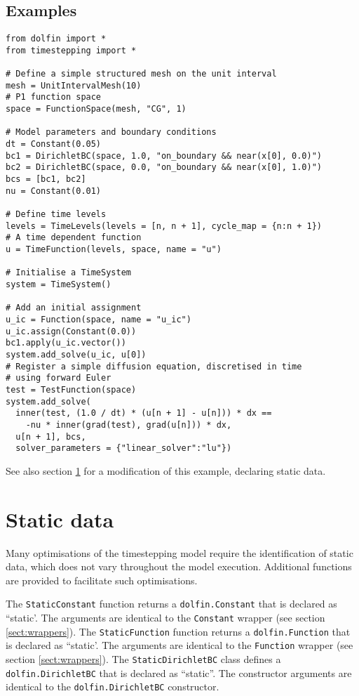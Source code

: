 \documentclass[a4paper]{book}
\begin{document}
\subsection*{Examples}

\begin{lstlisting}
from dolfin import *
from timestepping import *

# Define a simple structured mesh on the unit interval
mesh = UnitIntervalMesh(10)
# P1 function space
space = FunctionSpace(mesh, "CG", 1)

# Model parameters and boundary conditions
dt = Constant(0.05)
bc1 = DirichletBC(space, 1.0, "on_boundary && near(x[0], 0.0)")
bc2 = DirichletBC(space, 0.0, "on_boundary && near(x[0], 1.0)")
bcs = [bc1, bc2]
nu = Constant(0.01)

# Define time levels
levels = TimeLevels(levels = [n, n + 1], cycle_map = {n:n + 1})
# A time dependent function
u = TimeFunction(levels, space, name = "u")

# Initialise a TimeSystem
system = TimeSystem()

# Add an initial assignment
u_ic = Function(space, name = "u_ic")
u_ic.assign(Constant(0.0))
bc1.apply(u_ic.vector())
system.add_solve(u_ic, u[0])
# Register a simple diffusion equation, discretised in time
# using forward Euler
test = TestFunction(space)
system.add_solve(
  inner(test, (1.0 / dt) * (u[n + 1] - u[n])) * dx ==
    -nu * inner(grad(test), grad(u[n])) * dx,
  u[n + 1], bcs,
  solver_parameters = {"linear_solver":"lu"})
\end{lstlisting}
See also section \ref{sect:statics} for a modification of this example,
declaring static data.

\section{Static data}\label{sect:statics}

Many optimisations of the timestepping model require the identification of
static data, which does not vary throughout the model execution. Additional
functions are provided to facilitate such optimisations.

The \verb+StaticConstant+ function returns a \verb+dolfin.Constant+ that is
declared as ``static'. The arguments are identical to the \verb+Constant+
wrapper (see section \ref{sect:wrappers}). The \verb+StaticFunction+ function
returns a \verb+dolfin.Function+ that is declared as ``static'. The arguments
are identical to the \verb+Function+ wrapper (see section
\ref{sect:wrappers}). The \verb+StaticDirichletBC+ class defines a
\verb+dolfin.DirichletBC+ that is declared as ``static''. The constructor
arguments are identical to the \verb+dolfin.DirichletBC+ constructor.
\end{document}
